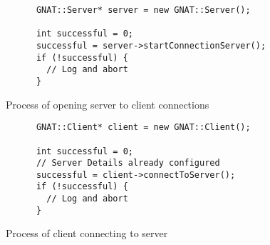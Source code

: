 \begin{figure}[!h]
  \centering
  \begin{lstlisting}
      GNAT::Server* server = new GNAT::Server();

      int successful = 0;
      successful = server->startConnectionServer();
      if (!successful) {
        // Log and abort
      }
  \end{lstlisting}
  \caption{Process of opening server to client connections}
  \label{code:server_conn}
\end{figure}

\begin{figure}[!h]
  \centering
  \begin{lstlisting}
      GNAT::Client* client = new GNAT::Client();

      int successful = 0;
      // Server Details already configured
      successful = client->connectToServer();
      if (!successful) {
        // Log and abort
      }
  \end{lstlisting}
  \caption{Process of client connecting to server}
  \label{code:client_conn}
\end{figure}
